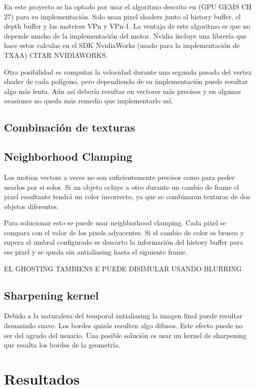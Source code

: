 \documentclass[withindex, glossary]{cam-thesis}
\begin{document}
En este proyecto se ha optado por usar el algoritmo descrito en (GPU GEMS CH 27) para su implementación. Solo usan pixel shaders junto al history buffer, el depth buffer y las matrices VPn y VPn-1. La ventaja de este algoritmo es que no depende mucho de la implementación del motor. Nvidia incluye una librería que hace estos calculas en el SDK NvidiaWorks (usado para la implementación de TXAA) CITAR NVIDIAWORKS.

Otra posibilidad es computar la velocidad durante una segunda pasada del vertex shader de cada polígono, pero dependiendo de su implementación puede resultar algo más lenta. Aún así debería resultar en vectores más precisos y en algunas ocasiones no queda más remedio que implementarlo así.

\section{Combinación de texturas}

\section{Neighborhood Clamping}

Los motion vectors a veces no son suficientemente precisos como para poder usarlos por si solos. Si un objeto ocluye a otro durante un cambio de frame el pixel resultante tendrá un color incorrecto, ya que se combinaran texturas de dos objetos diferentes.

Para solucionar esto se puede usar neighborhood clamping. Cada pixel se compara con el valor de los pixels adyacentes. Si el cambio de color es brusco y supera el umbral configurado se descarta la información del history buffer para ese pixel y se queda sin antialiasing hasta el siguiente frame.

EL GHOSTING TAMBIENS E PUEDE DISIMULAR USANDO BLURRING

\section{Sharpening kernel}

Debido a la naturaleza del temporal antialiasing la imagen final puede resultar demasiado suave. Los bordes quizás resulten algo difusos. Este efecto puede no ser del agrado del usuario. Una posible solución es usar un kernel de sharpening que resalta los bordes de la geometría.

\chapter{Resultados}
\end{document}
